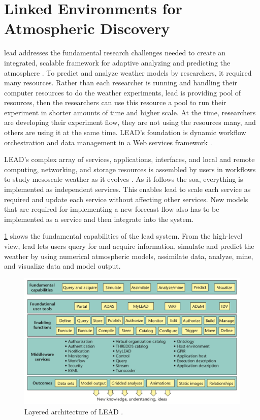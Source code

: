 \section{Linked Environments for Atmospheric Discovery}
\label{se:lead}

\acrfull{lead} addresses the fundamental research challenges needed to create an integrated, scalable framework for adaptive analyzing and predicting the atmosphere \cite{Droegemeier2005Service-OrientedWeather}. To predict and analyze weather models by researchers, it required many resources. Rather than each researcher is running and handling their computer resources to do the weather experiments, \acrshort{lead} is providing pool of resources, then the researchers can use this resource a pool to run their experiment in shorter amounts of time and higher scale. At the time, researchers are developing their experiment flow, they are not using the resources many, and others are using it at the same time. LEAD's foundation is dynamic workflow orchestration and data management in a Web services framework \cite{Droegemeier2005Service-OrientedWeather}.

LEAD's complex array of services, applications, interfaces, and local and remote computing, networking, and storage resources is assembled by users in workflows to study mesoscale weather as it evolves \cite{Droegemeier2005Service-OrientedWeather}. As it follows the \acrshort{soa}, everything is implemented as independent services. This enables \acrshort{lead} to scale each service as required and update each service without affecting other services. New models that are required for implementing a new forecast flow also has to be implemented as a service and then integrate into the system.

\cref{fi:lead_system} shows the fundamental capabilities of the \acrshort{lead} system. From the high-level view, \acrshort{lead} lets users query for and acquire information, simulate and predict the weather by using numerical atmospheric models, assimilate data, analyze, mine, and visualize data and model output.

\begin{figure}[htp]
    \centering
    \includegraphics[width=1.0\textwidth]{lit/lead/LEAD-system-Fundamental-capabilities-familiar-to-meteorologists-are-shown-in-the-top_W640.png}
    \caption[Layered architecture of LEAD]{Layered architecture of LEAD \cite{Droegemeier2005Service-OrientedWeather}.}
    \label{fi:lead_system}
\end{figure}

